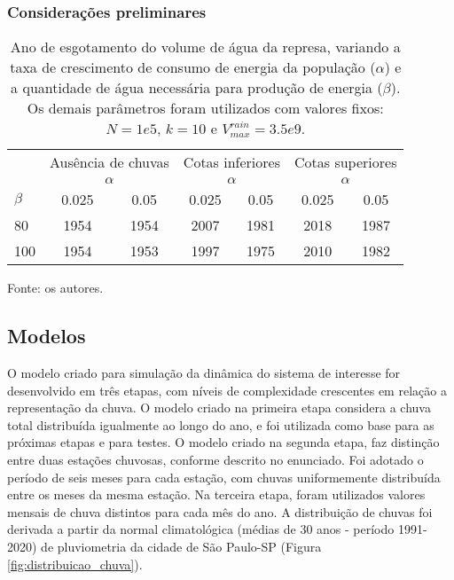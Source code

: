 \documentclass{article}
\begin{document}
\subsubsection*{Considerações preliminares}

\begin{table}[ht!]
    \centering
    \caption{Ano de esgotamento do volume de água da represa, variando a taxa de crescimento de consumo de energia da população ($\alpha$) e a quantidade de água necessária para produção de energia ($\beta$). Os demais parâmetros foram utilizados com valores fixos: $N = 1e5$, $k = 10$ e $V_{max}^{rain} = 3.5e9$.}
    \label{tab:cotas_ano_esgotamento}
    \begin{tabular}{lcccccc}
        \hline
             & \multicolumn{2}{l}{Ausência de chuvas} & \multicolumn{2}{l}{Cotas inferiores} & \multicolumn{2}{l}{Cotas superiores} \\ \cline{2-7} 
             & \multicolumn{2}{c}{$\alpha$}              & \multicolumn{2}{c}{$\alpha$}            & \multicolumn{2}{c}{$\alpha$}            \\ \cline{2-7} 
        $\beta$ & 0.025               & 0.05               & 0.025              & 0.05              & 0.025              & 0.05           \\ \hline
        80      & 1954                & 1954               & 2007               & 1981              & 2018               & 1987            \\
        100     & 1954                & 1953               & 1997               & 1975              & 2010               & 1982            \\ \hline
    \end{tabular}
    {\flushleft Fonte: os autores. \par}
\end{table}


\subsection*{Modelos}

O modelo criado para simulação da dinâmica do sistema de interesse for desenvolvido em três etapas, com níveis de complexidade crescentes em relação a representação da chuva. O modelo criado na primeira etapa considera a chuva total distribuída igualmente ao longo do ano, e foi utilizada como base para as próximas etapas e para testes. O modelo criado na segunda etapa, faz distinção entre duas estações chuvosas, conforme descrito no enunciado. Foi adotado o período de seis meses para cada estação, com chuvas uniformemente distribuída entre os meses da mesma estação. Na terceira etapa, foram utilizados valores mensais de chuva distintos para cada mês do ano. A distribuição de chuvas foi derivada a partir da normal climatológica (médias de 30 anos - período 1991-2020) de pluviometria da cidade de São Paulo-SP (Figura \ref{fig:distribuicao_chuva}).
\end{document}
